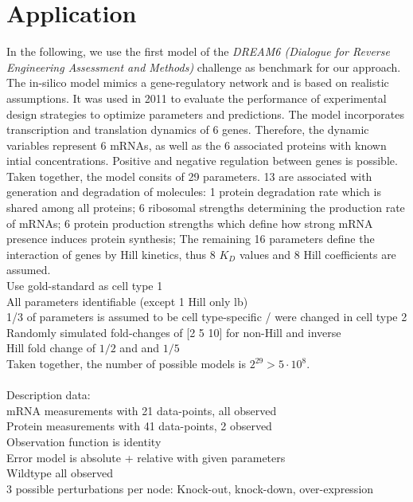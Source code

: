 \documentclass{bioinfo}
\begin{document}
\section{Application}
In the following, we use the first model of the \emph{DREAM6 (Dialogue for Reverse Engineering Assessment and Methods)} challenge as benchmark for our approach.
The in-silico model mimics a gene-regulatory network and is based on realistic assumptions.
It was used in 2011 to evaluate the performance of experimental design strategies to optimize parameters and predictions.
The model incorporates transcription and translation dynamics of 6 genes.
Therefore, the dynamic variables represent 6 mRNAs, as well as the 6 associated proteins with known intial concentrations.
Positive and negative regulation between genes is possible.
Taken together, the model consits of 29 parameters.
13 are associated with generation and degradation of molecules:
1 protein degradation rate which is shared among all proteins; 
6 ribosomal strengths determining the production rate of mRNAs;
6 protein production strengths which define how strong mRNA presence induces protein synthesis;
The remaining 16 parameters define the interaction of genes by Hill kinetics, thus 8 $K_D$ values and 8 Hill coefficients are assumed.\\
Use gold-standard as cell type 1\\
All parameters identifiable (except 1 Hill only lb)\\
1/3 of parameters is assumed to be cell type-specific / were changed in cell type 2\\
Randomly simulated fold-changes of [2 5 10] for non-Hill and inverse\\
Hill fold change of $1/2$ and and $1/5$\\
Taken together, the number of possible models is $2^{29}>5\cdot10^8$.\\ \\
Description data:\\
mRNA measurements with 21 data-points, all observed\\
Protein measurements with 41 data-points, 2 observed\\
Observation function is identity\\
Error model is absolute + relative with given parameters\\
Wildtype all observed\\
3 possible perturbations per node: Knock-out, knock-down, over-expression\\
\end{document}
